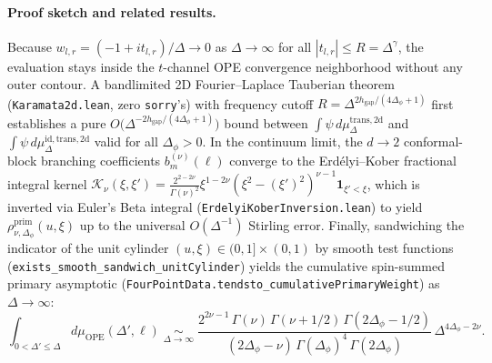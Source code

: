\documentclass[10pt,a4paper]{article}
\theoremstyle{definition}
\begin{document}
\paragraph{Proof sketch and related results.}
Because $w_{l,r} = (-1 + i t_{l,r})/\Delta \to 0$ as $\Delta \to \infty$ for all $|t_{l,r}| \le R = \Delta^\gamma$, the evaluation stays inside the $t$-channel OPE convergence neighborhood without any outer contour. A bandlimited 2D Fourier--Laplace Tauberian theorem (\texttt{Karamata2d.lean}, zero \texttt{sorry}'s) with frequency cutoff $R = \Delta^{2 h_{\mathrm{gap}} / (4\Delta_\phi + 1)}$ first establishes a pure $O\bigl(\Delta^{-2 h_{\mathrm{gap}}/(4\Delta_\phi + 1)}\bigr)$ bound between $\int \psi \, d\mu^{\mathrm{trans}, 2\mathrm{d}}_\Delta$ and $\int \psi \, d\mu^{\mathrm{id, trans}, 2\mathrm{d}}_\Delta$ valid for all $\Delta_\phi > 0$. In the continuum limit, the $d \to 2$ conformal-block branching coefficients $b_m^{(\nu)}(\ell)$ converge to the Erd\'elyi--Kober fractional integral kernel $\mathcal{K}_\nu(\xi, \xi') = \frac{2^{2-2\nu}}{\Gamma(\nu)^2}\xi^{1-2\nu}(\xi^2 - (\xi')^2)^{\nu-1}\mathbf{1}_{\xi' < \xi}$, which is inverted via Euler's Beta integral (\texttt{ErdelyiKoberInversion.lean}) to yield $\rho^{\mathrm{prim}}_{\nu, \Delta_\phi}(u, \xi)$ up to the universal $O(\Delta^{-1})$ Stirling error. Finally, sandwiching the indicator of the unit cylinder $(u, \xi) \in (0, 1] \times (0, 1)$ by smooth test functions (\texttt{exists\_smooth\_sandwich\_unitCylinder}) yields the cumulative spin-summed primary asymptotic (\texttt{FourPointData.tendsto\_cumulativePrimaryWeight}) as $\Delta \to \infty$:
\begin{equation}
  \int_{0 < \Delta' \le \Delta} d\mu_{\mathrm{OPE}}(\Delta', \ell) \;\underset{\Delta \to \infty}{\sim}\;
  \frac{2^{2\nu - 1} \, \Gamma(\nu) \, \Gamma(\nu + 1/2) \, \Gamma(2\Delta_\phi - 1/2)}{(2\Delta_\phi - \nu) \, \Gamma(\Delta_\phi)^4 \, \Gamma(2\Delta_\phi)} \, \Delta^{4\Delta_\phi - 2\nu}.
\end{equation}
\end{document}

